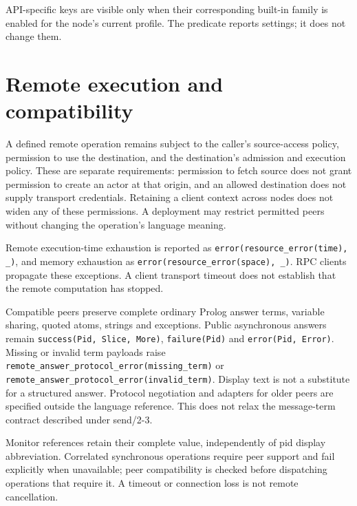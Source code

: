 \noindent API-specific keys are visible only when their corresponding
built-in family is enabled for the node's current profile. The predicate
reports settings; it does not change them.\par

\section{Remote execution and compatibility}\label{sec:manual-remote-compatibility}
A defined remote operation remains subject to the caller's source-access
policy, permission to use the destination, and the destination's admission
and execution policy. These are separate requirements: permission to fetch
source does not grant permission to create an actor at that origin, and an
allowed destination does not supply transport credentials. Retaining a client
context across nodes does not widen any of these permissions. A deployment
may restrict permitted peers without changing the operation's language meaning.

Remote execution-time exhaustion is reported as \texttt{error(\allowbreak{}resource\_\allowbreak{}error(\allowbreak{}time),\allowbreak{} \_\allowbreak{})}, and
memory exhaustion as \texttt{error(\allowbreak{}resource\_\allowbreak{}error(\allowbreak{}space),\allowbreak{} \_\allowbreak{})}. RPC clients propagate these
exceptions. A client transport timeout does not establish that the remote computation has stopped.

Compatible peers preserve complete ordinary Prolog answer terms, variable
sharing, quoted atoms, strings and exceptions. Public asynchronous answers
remain \texttt{success(Pid, Slice, More)}, \texttt{failure(Pid)} and
\texttt{error(Pid, Error)}. Missing or invalid term payloads raise
\texttt{remote\_\allowbreak{}answer\_\allowbreak{}protocol\_\allowbreak{}error(\allowbreak{}missing\_\allowbreak{}term)} or
\texttt{remote\_\allowbreak{}answer\_\allowbreak{}protocol\_\allowbreak{}error(\allowbreak{}invalid\_\allowbreak{}term)}. Display text is not
a substitute for a structured answer. Protocol negotiation and adapters for
older peers are specified outside the language reference. This does not relax
the message-term contract described under send/2-3.

Monitor references retain their complete value, independently of pid display abbreviation.
Correlated synchronous operations require peer support and fail explicitly when unavailable;
peer compatibility is checked before dispatching operations that require it. A timeout or connection loss is not
remote cancellation.

